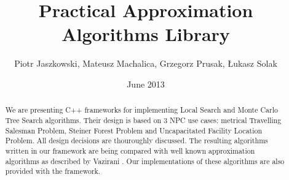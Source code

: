 \documentclass[licencjacka]{pracamgr}
\author{Piotr Jaszkowski, Mateusz Machalica, Grzegorz Prusak, Łukasz Solak}
\title{Practical Approximation Algorithms Library}
\date{June 2013}
\begin{document}
\maketitle

\begin{abstract}
  We are presenting C++ frameworks for implementing Local Search
  and Monte Carlo Tree Search algorithms. Their design is based
  on 3 NPC use cases: metrical Travelling Salesman Problem,
  Steiner Forest Problem and Uncapacitated Facility Location Problem.
  All design decisions are thouroughly discussed. The resulting
  algorithms written in our framework are being compared with
  well known approximation algorithms as described by Vazirani \cite{Vazirani}.
  Our implementations of these algorithms are also provided with the framework.
\end{abstract}

\tableofcontents








\appendix



\end{document}
